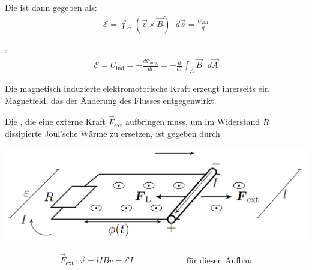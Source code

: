 Die  ist dann gegeben als:
\begin{align*}
    \mathcal{E} = \oint_C \ (\vec{v} \times \vec{B}) \cdot d \vec{s} = \frac{U_{BA}}{q}
\end{align*}

\vspace{1\baselineskip}

:
\begin{align*}
    \mathcal{E} = U_{\text{ind}} = - \frac{d \Phi_{\text{mag}}}{dt}
    = - \frac{d}{dt} \int_A \vec{B} \cdot d \vec{A}
\end{align*}

\vspace{1\baselineskip}


Die magnetisch induzierte elektromotorische Kraft erzeugt ihrerseits ein Magnetfeld, das der
Änderung des Flusses entgegenwirkt.

\vspace{1\baselineskip}

\begin{minipage}{0.2\textwidth}
    Die , die eine externe Kraft $\vec{F}_{\text{ext}}$ aufbringen muss, um im
    Widerstand $R$ dissipierte Joul'sche Wärme zu ersetzen, ist gegeben durch
\end{minipage} \hspace{15pt}
\begin{minipage}{0.25\textwidth}
    \begin{center}
        \includegraphics[width=\textwidth]{Figures/Lenz.png}
    \end{center}
\end{minipage}
\begin{align*}
    \vec{F}_{\text{ext}} \cdot \vec{v} = l I B v = \mathcal{E} I
    \quad \quad \quad \quad \quad \quad \text{ für diesen Aufbau}
\end{align*}

\vspace{1\baselineskip}

